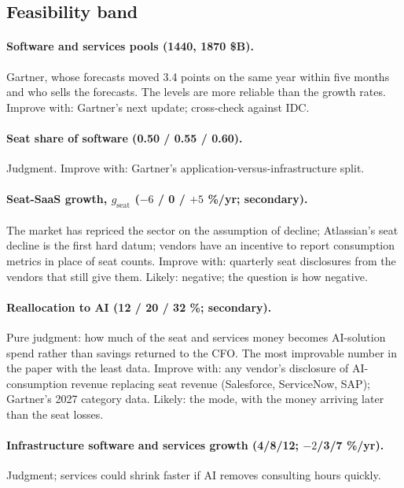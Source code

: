 \documentclass[11pt,letterpaper]{article}
\begin{document}
\subsection*{Feasibility band}

\paragraph{Software and services pools (1440, 1870 \$B).} Gartner, whose forecasts moved 3.4 points on the same year within five months and who sells the forecasts. The levels are more reliable than the growth rates. Improve with: Gartner's next update; cross-check against IDC.

\paragraph{Seat share of software (0.50 / 0.55 / 0.60).} Judgment. Improve with: Gartner's application-versus-infrastructure split.

\paragraph{Seat-SaaS growth, $g_{\text{seat}}$ ($-6$ / 0 / $+5$ \%/yr; secondary).} The market has repriced the sector on the assumption of decline; Atlassian's seat decline is the first hard datum; vendors have an incentive to report consumption metrics in place of seat counts. Improve with: quarterly seat disclosures from the vendors that still give them. Likely: negative; the question is how negative.

\paragraph{Reallocation to AI (12 / 20 / 32 \%; secondary).} Pure judgment: how much of the seat and services money becomes AI-solution spend rather than savings returned to the CFO. The most improvable number in the paper with the least data. Improve with: any vendor's disclosure of AI-consumption revenue replacing seat revenue (Salesforce, ServiceNow, SAP); Gartner's 2027 category data. Likely: the mode, with the money arriving later than the seat losses.

\paragraph{Infrastructure software and services growth (4/8/12; $-2$/3/7 \%/yr).} Judgment; services could shrink faster if AI removes consulting hours quickly.
\end{document}
